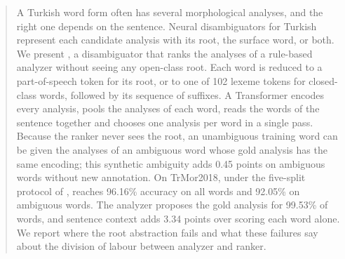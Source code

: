\begin{abstract}
A Turkish word form often has several morphological analyses, and the right one depends on the sentence. Neural disambiguators for Turkish represent each candidate analysis with its root, the surface word, or both. We present \savyar{}, a disambiguator that ranks the analyses of a rule-based analyzer without seeing any open-class root. Each word is reduced to a part-of-speech token for its root, or to one of 102 lexeme tokens for closed-class words, followed by its sequence of suffixes. A Transformer encodes every analysis, pools the analyses of each word, reads the words of the sentence together and chooses one analysis per word in a single pass. Because the ranker never sees the root, an unambiguous training word can be given the analyses of an ambiguous word whose gold analysis has the same encoding; this synthetic ambiguity adds 0.45 points on ambiguous words without new annotation. On TrMor2018, under the five-split protocol of \citet{akyurek-etal-2019-morphological}, \savyar{} reaches 96.16\% accuracy on all words and 92.05\% on ambiguous words. The analyzer proposes the gold analysis for 99.53\% of words, and sentence context adds 3.34 points over scoring each word alone. We report where the root abstraction fails and what these failures say about the division of labour between analyzer and ranker.
\end{abstract}
